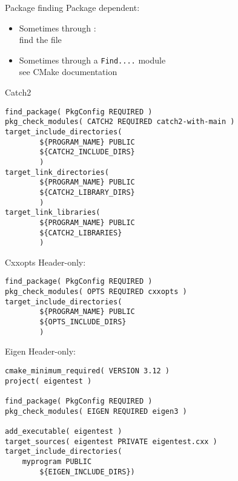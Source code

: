 
\begin{numberedframe}{Package finding} 
  Package dependent:
  \begin{itemize}
  \item Sometimes through :\\
    find the  file
  \item Sometimes through a \lstinline{Find....} module\\
    see CMake documentation
  \end{itemize}
\end{numberedframe}

\begin{numberedframe}{Catch2}
\begin{lstlisting}
find_package( PkgConfig REQUIRED )
pkg_check_modules( CATCH2 REQUIRED catch2-with-main )
target_include_directories(
        ${PROGRAM_NAME} PUBLIC
        ${CATCH2_INCLUDE_DIRS}
        )
target_link_directories(
        ${PROGRAM_NAME} PUBLIC
        ${CATCH2_LIBRARY_DIRS}
        )
target_link_libraries(
        ${PROGRAM_NAME} PUBLIC
        ${CATCH2_LIBRARIES}
        )
\end{lstlisting}
\end{numberedframe}

\begin{numberedframe}{Cxxopts}
Header-only:
\begin{lstlisting}
find_package( PkgConfig REQUIRED )
pkg_check_modules( OPTS REQUIRED cxxopts )
target_include_directories(
        ${PROGRAM_NAME} PUBLIC
        ${OPTS_INCLUDE_DIRS}
        )
\end{lstlisting}
\end{numberedframe}

\begin{numberedframe}{Eigen}
Header-only:
\begin{lstlisting}
cmake_minimum_required( VERSION 3.12 )
project( eigentest )

find_package( PkgConfig REQUIRED )
pkg_check_modules( EIGEN REQUIRED eigen3 )

add_executable( eigentest )
target_sources( eigentest PRIVATE eigentest.cxx )
target_include_directories(
	myprogram PUBLIC
        ${EIGEN_INCLUDE_DIRS})
\end{lstlisting}
\end{numberedframe}


